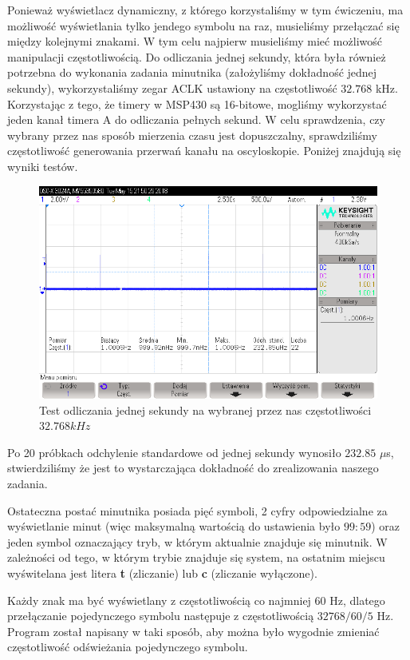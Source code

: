 \documentclass[fleqn]{article}
\begin{document}
Ponieważ wyświetlacz dynamiczny, z którego korzystaliśmy w tym ćwiczeniu, ma możliwość wyświetlania tylko jendego symbolu na raz, musieliśmy przełączać się między kolejnymi znakami. W tym celu najpierw musieliśmy mieć możliwość manipulacji częstotliwością. Do odliczania jednej sekundy, która była również potrzebna do wykonania zadania minutnika (założyliśmy dokładność jednej sekundy), wykorzystaliśmy zegar ACLK ustawiony na częstotliwość $32.768$ kHz. Korzystając z tego, że timery w MSP430 są 16-bitowe, mogliśmy wykorzystać jeden kanał timera A do odliczania pełnych sekund. W celu sprawdzenia, czy wybrany przez nas sposób mierzenia czasu jest dopuszczalny, sprawdziliśmy częstotliwość generowania przerwań kanału na oscyloskopie. Poniżej znajdują się wyniki testów.

\begin{figure}[H]
	\includegraphics[width=\textwidth]{scope_1.png}
	\caption{Test odliczania jednej sekundy na wybranej przez nas częstotliwości $32.768 kHz$}
\end{figure}

Po 20 próbkach odchylenie standardowe od jednej sekundy wynosiło $232.85$ $\mu$s, stwierdziliśmy że jest to wystarczająca dokładność do zrealizowania naszego zadania.

Ostateczna postać minutnika posiada pięć symboli, 2 cyfry odpowiedzialne za wyświetlanie minut (więc maksymalną wartością do ustawienia było $99:59$) oraz jeden symbol oznaczający tryb, w którym aktualnie znajduje się minutnik. W zależności od tego, w którym trybie znajduje się system, na ostatnim miejscu wyświtelana jest litera \textbf{t} (zliczanie) lub \textbf {c} (zliczanie wyłączone).

Każdy znak ma być wyświetlany z częstotliwością co najmniej $60$ Hz, dlatego przełączanie pojedynczego symbolu następuje z częstotliwością $32768 / 60 / 5$ Hz. Program został napisany w taki sposób, aby można było wygodnie zmieniać częstotliwość odświeżania pojedynczego symbolu.
\end{document}
